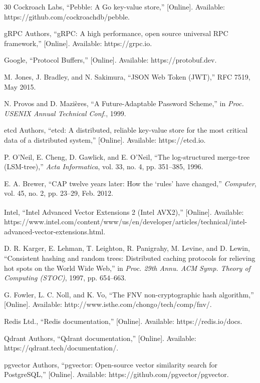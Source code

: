 \documentclass[conference]{IEEEtran}
\begin{document}
\begin{thebibliography}{30}
 Cockroach Labs, ``Pebble: A Go key-value store,'' [Online]. Available: https://github.com/cockroachdb/pebble.

 gRPC Authors, ``gRPC: A high performance, open source universal RPC framework,'' [Online]. Available: https://grpc.io.

 Google, ``Protocol Buffers,'' [Online]. Available: https://protobuf.dev.

 M. Jones, J. Bradley, and N. Sakimura, ``JSON Web Token (JWT),'' RFC 7519, May 2015.

 N. Provos and D. Mazi\`eres, ``A Future-Adaptable Password Scheme,'' in \emph{Proc. USENIX Annual Technical Conf.}, 1999.

 etcd Authors, ``etcd: A distributed, reliable key-value store for the most critical data of a distributed system,'' [Online]. Available: https://etcd.io.

 P. O'Neil, E. Cheng, D. Gawlick, and E. O'Neil, ``The log-structured merge-tree (LSM-tree),'' \emph{Acta Informatica}, vol. 33, no. 4, pp. 351--385, 1996.

 E. A. Brewer, ``CAP twelve years later: How the `rules' have changed,'' \emph{Computer}, vol. 45, no. 2, pp. 23--29, Feb. 2012.

 Intel, ``Intel\textsuperscript{\textregistered} Advanced Vector Extensions 2 (Intel\textsuperscript{\textregistered} AVX2),'' [Online]. Available: https://www.intel.com/content/www/us/en/developer/articles/technical/intel-advanced-vector-extensions.html.

 D. R. Karger, E. Lehman, T. Leighton, R. Panigrahy, M. Levine, and D. Lewin, ``Consistent hashing and random trees: Distributed caching protocols for relieving hot spots on the World Wide Web,'' in \emph{Proc. 29th Annu. ACM Symp. Theory of Computing (STOC)}, 1997, pp. 654--663.

 G. Fowler, L. C. Noll, and K. Vo, ``The FNV non-cryptographic hash algorithm,'' [Online]. Available: http://www.isthe.com/chongo/tech/comp/fnv/.

 Redis Ltd., ``Redis documentation,'' [Online]. Available: https://redis.io/docs.

 Qdrant Authors, ``Qdrant documentation,'' [Online]. Available: https://qdrant.tech/documentation/.

 pgvector Authors, ``pgvector: Open-source vector similarity search for PostgreSQL,'' [Online]. Available: https://github.com/pgvector/pgvector.

\end{thebibliography}
\end{document}
